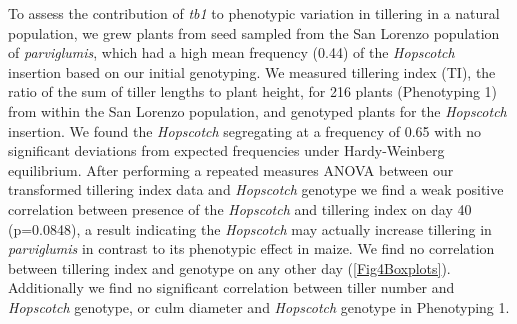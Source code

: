 \documentclass[11pt]{article}
\begin{document}
\begin{linenumbers}
\begin{flushleft}
To assess the contribution of \emph{tb1} to phenotypic variation in tillering in a natural population, we grew plants from seed sampled from the San Lorenzo population of \emph{parviglumis}, which had a high mean frequency (0.44) of the \emph{Hopscotch} insertion based on our initial genotyping. We measured tillering index (TI), the ratio of the sum of tiller lengths to plant height, for 216 plants (Phenotyping 1) from within the San Lorenzo population, and genotyped plants for the \emph{Hopscotch} insertion. We found the \emph{Hopscotch} segregating at a frequency of 0.65 with no significant deviations from expected frequencies under Hardy-Weinberg equilibrium. After performing a repeated measures ANOVA between our transformed tillering index data and \emph{Hopscotch} genotype we find a weak positive correlation between presence of the \emph{Hopscotch} and tillering index on day 40 (p=0.0848), a result indicating the \emph{Hopscotch} may actually increase tillering in \emph{parviglumis} in contrast to its phenotypic effect in maize. We find no correlation between tillering index and genotype on any other day (\ref{Fig4Boxplots}). Additionally we find no significant correlation between tiller number and \emph{Hopscotch} genotype, or culm diameter and \emph{Hopscotch} genotype in Phenotyping 1.


\end{flushleft}
\end{linenumbers}
\end{document}
